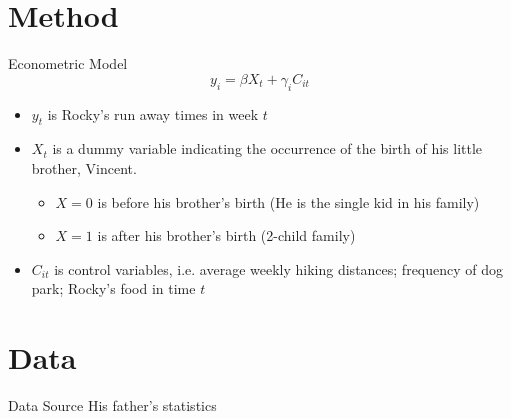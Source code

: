 \documentclass[10pt, xcolor=x11names,compress]{beamer}
\begin{document}
\section{Method}
 
\begin{frame}{Econometric Model}
$$
y_{i}=\beta X_{t}+\gamma_{i} C_{it}
$$
\begin{itemize}
 \item $y_{t}$ is Rocky's run away times in week $t$
 \item $X_{t}$ is a dummy variable indicating the occurrence of the birth of his little brother, Vincent.
    \begin{itemize}
        \item $X=0$ is before his brother's birth (He is the single kid in his family)
        \item $X=1$ is after his brother's birth (2-child family)
    \end{itemize}
 \item $C_{i t}$ is control variables, i.e. average weekly hiking distances; frequency of dog park; Rocky's food in time $t$ 

\end{itemize}
\end{frame}


\section{Data}
\begin{frame}{Data Source}
His father's statistics
   
\end{frame}
\end{document}
